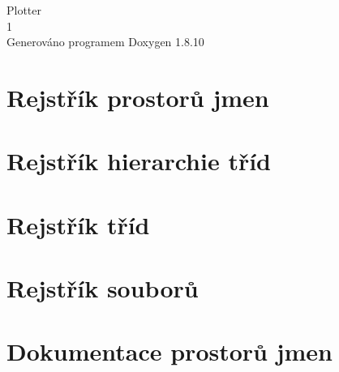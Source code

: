 \documentclass[twoside]{book}
\newcommand{\+}{\discretionary{\mbox{\scriptsize$\hookleftarrow$}}{}{}}
\newcommand{\clearemptydoublepage}{%
  \newpage{\pagestyle{empty}\cleardoublepage}%
}
\begin{document}
\hypersetup{pageanchor=false,
             bookmarks=true,
             bookmarksnumbered=true,
             pdfencoding=unicode
            }
\begin{titlepage}
\vspace*{7cm}
\begin{center}%
{\Large Plotter \\[1ex]\large 1 }\\
\vspace*{1cm}
{\large Generováno programem Doxygen 1.8.10}\\
\end{center}
\end{titlepage}
\clearemptydoublepage
\tableofcontents
\clearemptydoublepage
{}
\hypersetup{pageanchor=true}

\chapter{Rejstřík prostorů jmen}

\chapter{Rejstřík hierarchie tříd}

\chapter{Rejstřík tříd}

\chapter{Rejstřík souborů}

\chapter{Dokumentace prostorů jmen}

\end{document}
